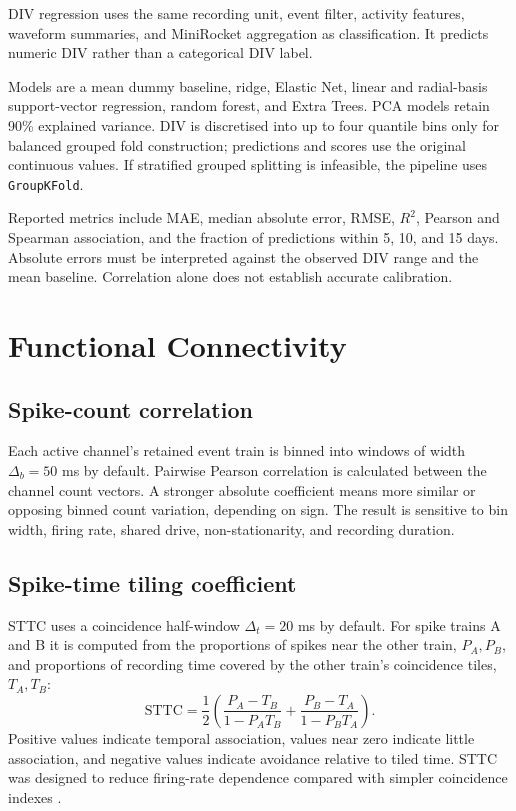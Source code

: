 \documentclass[11pt,a4paper]{article}
\newcommand{\code}[1]{\texttt{#1}}
\begin{document}
DIV regression uses the same recording unit, event filter, activity features,
waveform summaries, and MiniRocket aggregation as classification. It predicts
numeric DIV rather than a categorical DIV label.

Models are a mean dummy baseline, ridge, Elastic Net, linear and radial-basis
support-vector regression, random forest, and Extra Trees. PCA models retain
90\% explained variance. DIV is discretised into up to four quantile bins only
for balanced grouped fold construction; predictions and scores use the original
continuous values. If stratified grouped splitting is infeasible, the pipeline
uses \code{GroupKFold}.

Reported metrics include MAE, median absolute error, RMSE, \(R^2\), Pearson and
Spearman association, and the fraction of predictions within 5, 10, and 15 days.
Absolute errors must be interpreted against the observed DIV range and the mean
baseline. Correlation alone does not establish accurate calibration.

\section{Functional Connectivity}

\subsection{Spike-count correlation}

Each active channel's retained event train is binned into windows of width
\(\Delta_b=50\) ms by default. Pairwise Pearson correlation is calculated
between the channel count vectors. A stronger absolute coefficient means more
similar or opposing binned count variation, depending on sign. The result is
sensitive to bin width, firing rate, shared drive, non-stationarity, and
recording duration.

\subsection{Spike-time tiling coefficient}

STTC uses a coincidence half-window \(\Delta_t=20\) ms by default. For spike
trains A and B it is computed from the proportions of spikes near the other
train, \(P_A,P_B\), and proportions of recording time covered by the other
train's coincidence tiles, \(T_A,T_B\):
\[
 \mathrm{STTC}=\frac{1}{2}\left(
 \frac{P_A-T_B}{1-P_AT_B}+
 \frac{P_B-T_A}{1-P_BT_A}\right).
\]
Positive values indicate temporal association, values near zero indicate little
association, and negative values indicate avoidance relative to tiled time.
STTC was designed to reduce firing-rate dependence compared with simpler
coincidence indexes \cite{cutts2014}.
\end{document}
